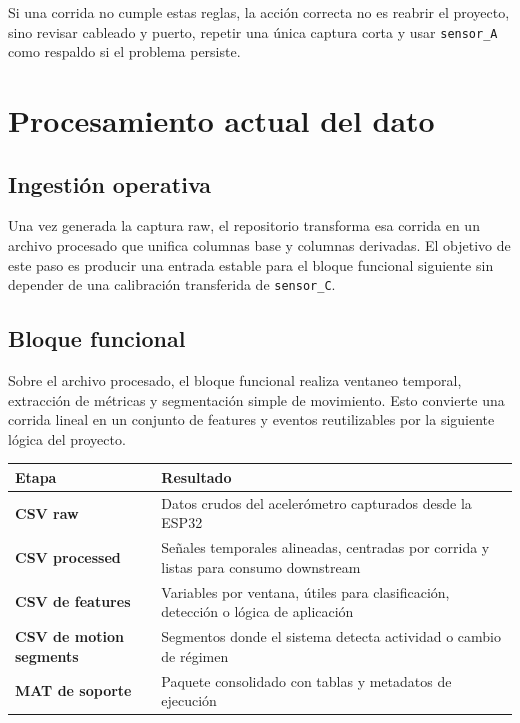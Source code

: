 \documentclass[11pt,a4paper]{article}
\begin{document}
Si una corrida no cumple estas reglas, la acción correcta no es reabrir el proyecto, sino revisar cableado y puerto, repetir una única captura corta y usar \texttt{sensor\_A} como respaldo si el problema persiste.

\section{Procesamiento actual del dato}

\subsection{Ingestión operativa}

Una vez generada la captura raw, el repositorio transforma esa corrida en un archivo procesado que unifica columnas base y columnas derivadas. El objetivo de este paso es producir una entrada estable para el bloque funcional siguiente sin depender de una calibración transferida de \texttt{sensor\_C}.

\subsection{Bloque funcional}

Sobre el archivo procesado, el bloque funcional realiza ventaneo temporal, extracción de métricas y segmentación simple de movimiento. Esto convierte una corrida lineal en un conjunto de features y eventos reutilizables por la siguiente lógica del proyecto.

\begin{center}
\renewcommand{\arraystretch}{1.35}
\begin{tabularx}{\textwidth}{>{\bfseries}p{3.4cm}X}
\toprule
Etapa & Resultado \\
\midrule
CSV raw & Datos crudos del acelerómetro capturados desde la ESP32 \\
CSV processed & Señales temporales alineadas, centradas por corrida y listas para consumo downstream \\
CSV de features & Variables por ventana, útiles para clasificación, detección o lógica de aplicación \\
CSV de motion segments & Segmentos donde el sistema detecta actividad o cambio de régimen \\
MAT de soporte & Paquete consolidado con tablas y metadatos de ejecución \\
\bottomrule
\end{tabularx}
\end{center}
\end{document}
